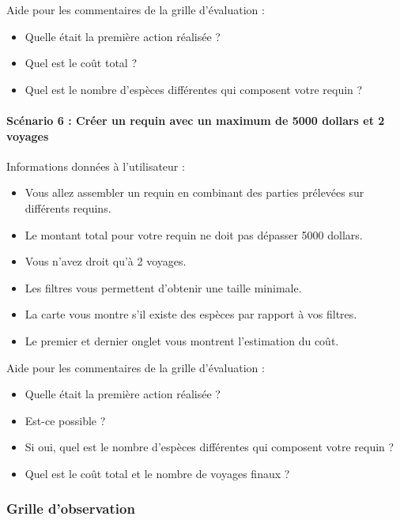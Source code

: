 \documentclass{article}
\begin{document}
Aide pour les commentaires de la grille d'évaluation :
\begin{itemize}
    \item Quelle était la première action réalisée ?
    \item Quel est le coût total ?
    \item Quel est le nombre d'espèces différentes qui composent votre requin ?
\end{itemize}

\paragraph{Scénario 6 : Créer un requin avec un maximum de 5000 dollars et 2 voyages}
Informations données à l'utilisateur :
\begin{itemize}
    \item Vous allez assembler un requin en combinant des parties prélevées sur différents requins.
    \item Le montant total pour votre requin ne doit pas dépasser 5000 dollars.
    \item Vous n'avez droit qu'à 2 voyages.
    \item Les filtres vous permettent d'obtenir une taille minimale.
    \item La carte vous montre s'il existe des espèces par rapport à vos filtres.
    \item Le premier et dernier onglet vous montrent l'estimation du coût.
\end{itemize}

Aide pour les commentaires de la grille d'évaluation :
\begin{itemize}
    \item Quelle était la première action réalisée ?
    \item Est-ce possible ?
    \item Si oui, quel est le nombre d'espèces différentes qui composent votre requin ?
    \item Quel est le coût total et le nombre de voyages finaux ?
\end{itemize}

\subsubsection{Grille d'observation}
\end{document}
